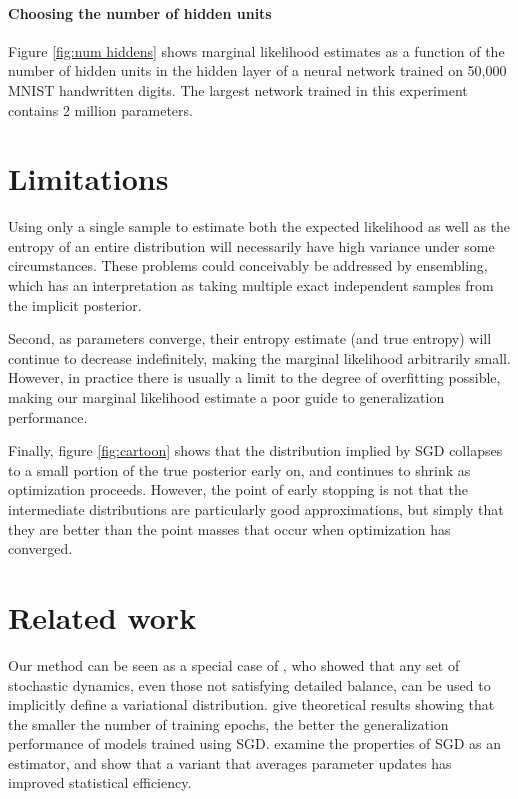 \documentclass{article} %
\begin{document}
\paragraph{Choosing the number of hidden units}
Figure \ref{fig:num hiddens} shows marginal likelihood estimates as a function of the number of hidden units in the hidden layer of a neural network trained on 50,000 MNIST handwritten digits.
The largest network trained in this experiment contains 2 million parameters.

\section{Limitations}
\label{sec:limitations}
Using only a single sample to estimate both the expected likelihood as well as the entropy of an entire distribution will necessarily have high variance under some circumstances.
These problems could conceivably be addressed by ensembling, which has an interpretation as taking multiple exact independent samples from the implicit posterior.

Second, as parameters converge, their entropy estimate (and true entropy) will continue to decrease indefinitely, making the marginal likelihood arbitrarily small.
However, in practice there is usually a limit to the degree of overfitting possible, making our marginal likelihood estimate a poor guide to generalization performance.

Finally, figure \ref{fig:cartoon} shows that the distribution implied by SGD collapses to a small portion of the true posterior early on, and continues to shrink as optimization proceeds.
However, the point of early stopping is not that the intermediate distributions are particularly good approximations, but simply that they are better than the point masses that occur when optimization has converged.


\section{Related work}

Our method can be seen as a special case of \citet{Bridging14}, who showed that any set of stochastic dynamics, even those not satisfying detailed balance, can be used to implicitly define a variational distribution.
%
\citet{hardt2015train} give theoretical results showing that the smaller the number of training epochs, the better the generalization performance of models trained using SGD.
\citet{Dustin15} examine the properties of SGD as an estimator, and show that a variant that averages parameter updates has improved statistical efficiency.
\end{document}
